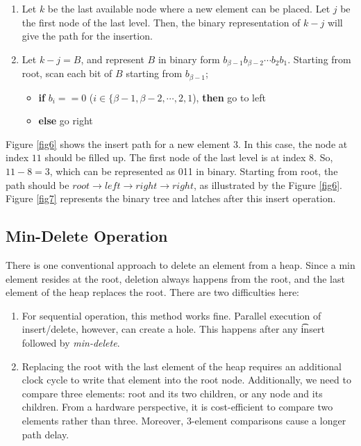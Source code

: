 \documentclass[10pt, conference, compsocconf]{IEEEtran}
\begin{document}
\begin{enumerate}
\item Let $k$ be the last available node where a new element can be placed. Let $j$ be the first node of the last level. Then, the binary representation of $k-j$ will give the path for the insertion.
\item Let $k-j = B$, and represent $B$ in binary form $b_{\beta-1}b_{\beta-2} \cdots b_2b_1$. Starting from root, scan each bit of $B$ starting from $b_{\beta-1}$;
    \begin{itemize}
    \item {\bf if} $b_i == 0$ ($i \in \{\beta-1,\beta-2, \cdots, 2,1$), {\bf then} go to left
    \item {\bf else} go right
    \end{itemize}
\end{enumerate}

Figure \ref{fig6} shows the insert path for a new element $3$. In this case, the node at index $11$ should be filled up.
The first node of the last level is at index $8$.
So, $11 - 8 = 3$, which can be represented as 011 in binary.
Starting from root, the path should be $root \rightarrow left \rightarrow right \rightarrow right$, as illustrated by the Figure \ref{fig6}. Figure \ref{fig7} represents the binary tree and latches after this insert operation.

\subsection{Min-Delete Operation}

There is one conventional approach to delete an element from a heap.
Since a min element resides at the root, deletion always happens from the root, and the last element of the heap replaces the root.
There are two difficulties here:

\begin{enumerate}
\item For sequential operation, this method works fine. Parallel execution of insert/delete, however, can create a hole. This happens after any {\t insert} followed by {\it min-delete}.
\item Replacing the root with the last element of the heap requires an additional clock cycle to write that element into the root node. Additionally, we need to compare three elements: root and its two children, or any node and its children. From a hardware perspective, it is cost-efficient to compare two elements rather than three. Moreover, 3-element comparisons cause a longer path delay.
\end{enumerate}
\end{document}
